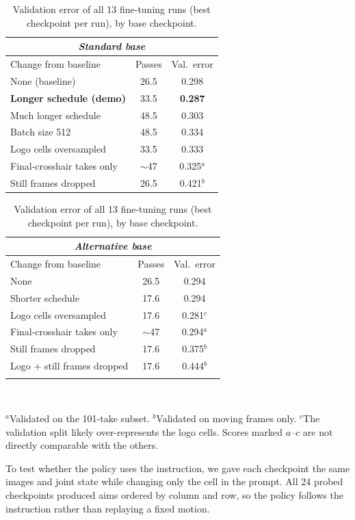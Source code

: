 \documentclass[10pt,letterpaper]{article}
\begin{document}
\begin{table}[!ht]
\centering\footnotesize\renewcommand{\arraystretch}{0.95}
\caption{Validation error of all 13 fine-tuning runs (best checkpoint per run), by base checkpoint.}
\label{tab:runs}
\begin{tabular}{@{}lcc@{}}
\multicolumn{3}{c}{\textit{Standard base}}\\
\toprule
Change from baseline & Passes & Val.\ error \\
\midrule
None (baseline) & 26.5 & 0.298 \\
\rowcolor{vlaF}\textbf{Longer schedule (demo)} & 33.5 & \textbf{0.287} \\
Much longer schedule & 48.5 & 0.303 \\
Batch size 512 & 48.5 & 0.334 \\
Logo cells oversampled & 33.5 & 0.333 \\
Final-crosshair takes only & $\sim$47 & 0.325$^{a}$ \\
Still frames dropped & 26.5 & 0.421$^{b}$ \\
\bottomrule
\end{tabular}\hspace{1.2em}%
\begin{tabular}{@{}lcc@{}}
\multicolumn{3}{c}{\textit{Alternative base}}\\
\toprule
Change from baseline & Passes & Val.\ error \\
\midrule
None & 26.5 & 0.294 \\
Shorter schedule & 17.6 & 0.294 \\
Logo cells oversampled & 17.6 & 0.281$^{c}$ \\
Final-crosshair takes only & $\sim$47 & 0.294$^{a}$ \\
Still frames dropped & 17.6 & 0.375$^{b}$ \\
Logo + still frames dropped & 17.6 & 0.444$^{b}$ \\
\addlinespace[1.05em]
\bottomrule
\end{tabular}\\[3pt]
\parbox{0.92\textwidth}{\footnotesize $^{a}$Validated on the 101-take subset. $^{b}$Validated on moving frames only. $^{c}$The validation split likely over-represents the logo cells. Scores marked $a$--$c$ are not directly comparable with the others.}
\end{table}

To test whether the policy uses the instruction, we gave each checkpoint the same images and joint state while changing only the cell in the prompt. All 24 probed checkpoints produced aims ordered by column and row, so the policy follows the instruction rather than replaying a fixed motion.
\end{document}
